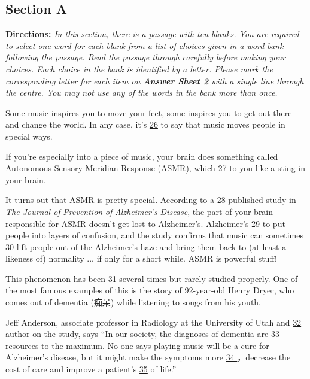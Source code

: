 \documentclass[UTF8,11pt]{ctexart}
\begin{document}
\subsection*{\textbf{Section A}}


\textbf{Directions:} \textit{In this section, there is a passage with ten blanks. You are required to select one word for each blank} \textit{from a list of choices given in a word bank following the passage. Read the passage through carefully before} \textit{making your choices. Each choice in the bank is identified by a letter. Please mark the corresponding letter for} \textit{each item on }\textbf{\textit{Answer Sheet 2}}\textit{ with a single line through the centre. You may not use any of the words in the bank} \textit{more than once.}


Some music inspires you to move your feet, some inspires you to get out there and change the world. In any case, it’s \uline{26} to say that music moves people in special ways.


If you’re especially into a piece of music, your brain does something called Autonomous Sensory Meridian Response (ASMR), which \uline{27} to you like a sting in your brain.


It turns out that ASMR is pretty special. According to a \uline{28} published study in \textit{The Journal of} \textit{Prevention} \textit{of} \textit{Alzheimer’s} \textit{Disease}, the part of your brain responsible for ASMR doesn’t get lost to Alzheimer’s. Alzheimer’s \uline{29} to put people into layers of confusion, and the study confirms that music can sometimes \uline{30} lift people out of the Alzheimer’s haze and bring them back to (at least a likeness of) normality ... if only for a short while. ASMR is powerful stuff!


This phenomenon has been \uline{31} several times but rarely studied properly. One of the most famous examples of this is the story of 92-year-old Henry Dryer, who comes out of dementia (痴呆) while listening to songs from his youth.


Jeff Anderson, associate professor in Radiology at the University of Utah and \uline{32} author on the study, says “In our society, the diagnoses of dementia are \uline{33} resources to the maximum. No one says playing music will be a cure for Alzheimer’s disease, but it might make the symptoms more \uline{34 }，decrease the cost of care and improve a patient’s \uline{35} of life.”
\end{document}
